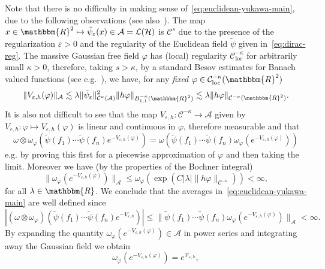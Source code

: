 \documentclass[11pt]{article}
\newcommand{\tmop}[1]{\ensuremath{\operatorname{#1}}}
\newcommand{\tmtextit}[1]{{\itshape{#1}}}
\begin{document}
Note that there is no difficulty in making sense
of~{\eqref{eq:euclidean-yukawa-main}}, due to the following observations (see
also~{\cite{osterwalder_euclidean_1973-2}}). The map $x \in \mathbbm{R}^2
\mapsto \tilde{\psi}_{\varepsilon} (x) \in \mathcal{A}= \mathcal{L}
(\mathcal{H})$ is $\mathcal{C}^s$ due to the presence of the regularization
$\varepsilon > 0$ and the regularity of the Euclidean field $\tilde{\psi}$
given in~{\eqref{eq:dirac-reg}}. The massive Gaussian free field $\varphi$ has
(local) regularity $\mathcal{C}^{- \kappa}_{\tmop{loc}}$ for arbitrarily small
$\kappa > 0$, therefore, taking $s > \kappa$, by a standard Besov estimates
for Banach valued functions (see e.g.~{\cite{Amann1997,Amann2019}}), we have,
for any \tmtextit{fixed} $\varphi \in \mathcal{C}^{- \kappa}_{\tmop{loc}}
(\mathbbm{R}^2)$
\[ \| V_{\varepsilon, h} (\varphi) \|_{\mathcal{A}} \lesssim \lambda \|
   \tilde{\psi}_{\varepsilon} \|^2_{\mathcal{C}^{\kappa} (\mathcal{A})} \| h
   \varphi \|_{B^{- \kappa}_{1, 1} (\mathbbm{R}^2)} \lesssim \lambda \| h
   \varphi \|_{\mathcal{C}^{- \kappa} (\mathbbm{R}^2)} . \]
It is also not difficult to see that the map $V_{\varepsilon, h} :
\mathcal{C}^{- \kappa} \rightarrow \mathcal{A}$ given by $V_{\varepsilon, h} :
\varphi \mapsto V_{\varepsilon, h} (\varphi)$ is linear and continuous in
$\varphi$, therefore measurable and that
\[ \omega \otimes \omega_{\varphi} (\tilde{\psi} (f_1) \cdots \tilde{\psi}
   (f_n) e^{- V_{\varepsilon, h} (\varphi)}) = \omega (\tilde{\psi} (f_1)
   \cdots \tilde{\psi} (f_n) \omega_{\varphi} (e^{- V_{\varepsilon, h}
   (\varphi)})) \]
e.g. by proving this first for a piecewise approximation of $\varphi$ and then
taking the limit. Moreover we have (by the properties of the Bochner integral)
\[ \| \omega_{\varphi} (e^{- V_{\varepsilon, h} (\varphi)}) \|_{\mathcal{A}}
   \leqslant \omega_{\varphi} (\exp (C | \lambda | \| h \varphi
   \|_{\mathcal{C}^{- \kappa}})) < \infty, \]
for all $\lambda \in \mathbbm{R}$. We conclude that the averages
in~{\eqref{eq:euclidean-yukawa-main}} are well defined since
\[ | (\omega \otimes \omega_{\varphi}) (\tilde{\psi} (f_1) \cdots
   \tilde{\psi} (f_n) e^{- V_{\varepsilon, h}}) | \leqslant \| \tilde{\psi}
   (f_1) \cdots \tilde{\psi} (f_n) \omega_{\varphi} (e^{- V_{\varepsilon, h}
   (\varphi)}) \|_{\mathcal{A}} < \infty . \]
By expanding the quantity $\omega_{\varphi} (e^{- V_{\varepsilon, h}
(\varphi)}) \in \mathcal{A}$ in power series and integrating away the Gaussian
field we obtain
\[ \omega_{\varphi} (e^{- V_{\varepsilon, h} (\varphi)}) =
   e^{\mathcal{V}_{\varepsilon, h}}, \]
\end{document}
